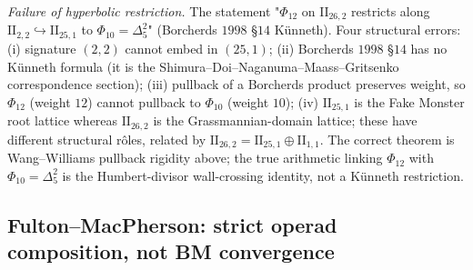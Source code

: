 \begin{theorem}
\emph{Failure of hyperbolic restriction.} The statement
"$\Phi_{12}$ on $\mathrm{II}_{26,2}$ restricts
along $\mathrm{II}_{2,2} \hookrightarrow \mathrm{II}_{25,1}$ to
$\Phi_{10} = \Delta_5^2$" (Borcherds $1998$ \S$14$ K\"unneth). Four
structural errors: (i) signature $(2, 2)$ cannot embed in $(25, 1)$;
(ii) Borcherds $1998$ \S$14$ has no K\"unneth formula (it is the
Shimura--Doi--Naganuma--Maass--Gritsenko correspondence section);
(iii) pullback of a Borcherds product preserves weight, so
$\Phi_{12}$ (weight $12$) cannot pullback to $\Phi_{10}$ (weight $10$);
(iv) $\mathrm{II}_{25, 1}$ is the Fake Monster root lattice whereas
$\mathrm{II}_{26, 2}$ is the Grassmannian-domain lattice; these have
different structural r\^oles, related by $\mathrm{II}_{26, 2} = \mathrm{II}_{25,
1} \oplus \mathrm{II}_{1, 1}$. The correct theorem is Wang--Williams
pullback rigidity above; the true arithmetic linking $\Phi_{12}$ with
$\Phi_{10} = \Delta_5^2$ is the Humbert-divisor wall-crossing identity,
not a K\"unneth restriction.
\end{theorem}

\subsection{Fulton--MacPherson: strict operad composition, not BM
convergence}
\label{wn:subsec:second-pass-FM-reason}

